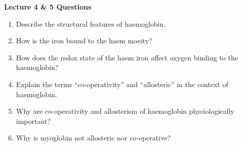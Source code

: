 \newpage
\begin{center}
\textbf{Lecture 4 \& 5 Questions}
\end{center}

\begin{enumerate}

\item Describe the structural features of haemoglobin.


\item How is the iron bound to the haem moeity?


\item How does the redox state of the haem iron affect oxygen binding to the haemoglobin?


\item Explain the terms ``co-operativity'' and ``allosteric'' in the context of haemoglobin.


\item Why are co-operativity and allosterism of haemoglobin physiologically important?


\item Why is myoglobin not allosteric nor co-operative?


\end{enumerate}
